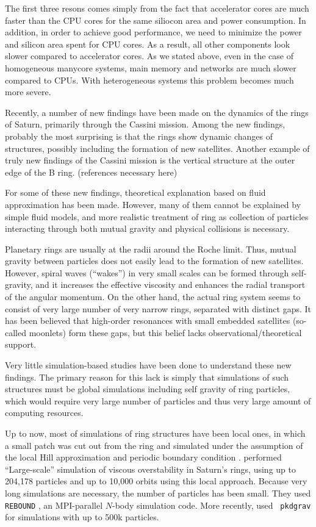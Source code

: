 \documentclass[]{pasj01}
\begin{document}
The first three resons comes simply from the fact that accelerator
cores are much faster than the CPU cores for the same siliocon area
and power consumption. In addition, in order to achieve good
performance, we need to minimize the power and silicon area spent for
CPU cores.  As a result, all other components look slower compared to
accelerator cores. As we stated above, even in the case of homogeneous
manycore systems, main memory and networks are much slower compared to
CPUs. With heterogeneous systems this problem becomes much more
severe.





Recently,  a number of new
findings have been made on the dynamics of the rings of Saturn,
primarily through the  Cassini mission.
Among the new findings, probably  the most
surprising is that the rings show dynamic changes of structures,
possibly including the formation of new satellites. Another example of
truly new findings of the Cassini mission is the vertical structure at
the outer edge of the B ring. (references necessary here)

For some of these new findings, theoretical explanation based on fluid
approximation has been made. However, many of them cannot be explained
by simple fluid models, and more realistic treatment of ring as
collection of particles interacting through both mutual gravity and
physical collisions is necessary.

Planetary rings are usually at the radii around the Roche limit. Thus,
mutual gravity between particles does not easily lead to the formation
of new satellites. However,  spiral waves 
(``wakes'') in very small scales can be formed through self-gravity,
and it  increases the effective
viscosity and enhances the radial transport of the angular
momentum. On the other hand, the actual ring system seems to consist
of very large number of very narrow rings, separated with distinct
gaps. It has been  believed that high-order resonances with small embedded
satellites (so-called moonlets) form these gaps, but this belief lacks
observational/theoretical support.


Very little simulation-based studies have been done to understand
these new findings. The primary reason for this lack is simply that
simulations of such structures must be global simulations including
self gravity of ring particles, which would require very large number
of particles and thus very large amount of computing resources.

Up to now, most of simulations of ring structures have been local
ones, in which a small patch was cut out from the ring and simulated
under the assumption of the local Hill approximation and periodic
boundary condition \citep{WisdomTremaine1988}. \citet{ReinLatter2013}
performed ``Large-scale'' simulation of viscous overstability in
Saturn's rings, using up to 204,178 particles and up to 10,000 orbits
using this local approach. Because very long simulations are
necessary, the number of particles has been small. They used {\tt
  REBOUND} \citep{ReinLiu2012}, an MPI-parallel $N$-body simulation
code. More recently, \citet{Ballouzetal2017} used {\tt
  pkdgrav}\citep{Stadel2001} for simulations with up to 500k
particles.
\end{document}
